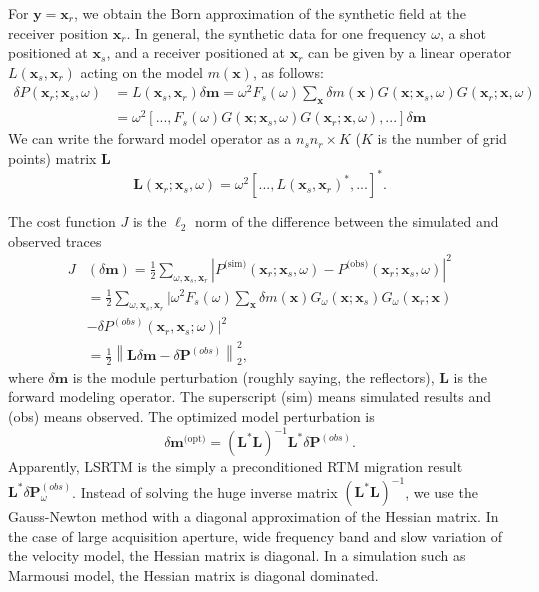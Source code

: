\documentclass[11pt]{article}
\newcommand{\bx}{\boldsymbol{x}}
\newcommand{\by}{\boldsymbol{y}}
\newcommand{\bL}{\boldsymbol{L}}
\newcommand{\bm}{\boldsymbol{m}}
\newcommand{\bP}{\boldsymbol{P}}
\theoremstyle{plain}
\theoremstyle{definition}
\theoremstyle{remark}
\numberwithin{equation}{section}
\begin{document}
For $\by=\bx_r$, we obtain the Born approximation of the synthetic field at the receiver position $\bx_r$. In general, the synthetic data for one frequency $\omega$, a shot positioned at $\bx_s$, and a receiver positioned at $\bx_r$ can be given by a linear operator $L(\bx_s,\bx_r)$ acting on the model $m(\bx)$, as follows:
\begin{align}
\delta P(\bx_r;\bx_s, \omega)&=L(\bx_s,\bx_r)\delta \bm=\omega^2 F_s(\omega)\sum_{\bx}\delta m(\bx)G(\bx;\bx_s,\omega)G(\bx_r;\bx,\omega)\nonumber\\
&=\omega^2 [...,F_s(\omega)G(\bx;\bx_s,\omega)G(\bx_r;\bx,\omega),...]\delta \bm
\end{align} 
We can write the forward model operator as a $n_s n_r\times K$ ($K$ is the number of grid points) matrix $\bL$
\begin{equation}
\label{eq:operatorL}
\bL(\bx_r;\bx_s,\omega) = \omega^2 [...,L(\bx_s,\bx_r)^*,...]^*.
\end{equation}

The cost function $J$ is the $\ell_2$ norm of the difference between the simulated and observed traces
  \begin{equation}
  \begin{aligned}
  J&(\delta \bm) = \frac{1}{2} \sum\limits_{\omega,\bx_s,\bx_r}  \left| P^{\text{(sim)}}(\bx_r; \bx_s,  \omega) - P^{\text{(obs)}}(\bx_r; \bx_s, \omega) \right|^2 \\
  &= \frac{1}{2} \sum\limits_{\omega,\bx_s,\bx_r} \Big| \omega^2 F_s(\omega) \sum\limits_{\bx}\delta m(\bx)G_{\omega}(\bx; \bx_s)G_{\omega}(\bx_r; \bx) \\&- \delta P^{(obs)}(\bx_r, \bx_s; \omega) \Big|^2\\
  &= \frac{1}{2} \left\| \bL\delta \bm - \delta\bP^{(obs)}\right\|_2^2,
  \end{aligned}
  \end{equation}
  where $\delta \bm$ is the module perturbation (roughly saying, the reflectors), $\bL$ is the forward modeling operator. The superscript (sim) means simulated results and (obs) means
  observed. The optimized model perturbation is 
    \begin{equation}
    \delta \bm^{\text{(opt)}} = \left( \bL^{*}\bL \right)^{-1} \bL^{*} \delta\bP^{(obs)}.
    \end{equation}
    Apparently, LSRTM is the simply a preconditioned RTM migration result $\bL^{*}\delta \bP^{(obs)}_{\omega}$. 
    Instead of solving the huge inverse matrix $(\bL^{*}\bL)^{-1}$,  we use the Gauss-Newton method with a diagonal approximation 
    of the Hessian matrix. In the case of large acquisition aperture, wide frequency band and slow variation of the velocity model, the Hessian matrix
    is diagonal. In a simulation such as Marmousi model, the Hessian matrix is diagonal dominated. 
\end{document}
